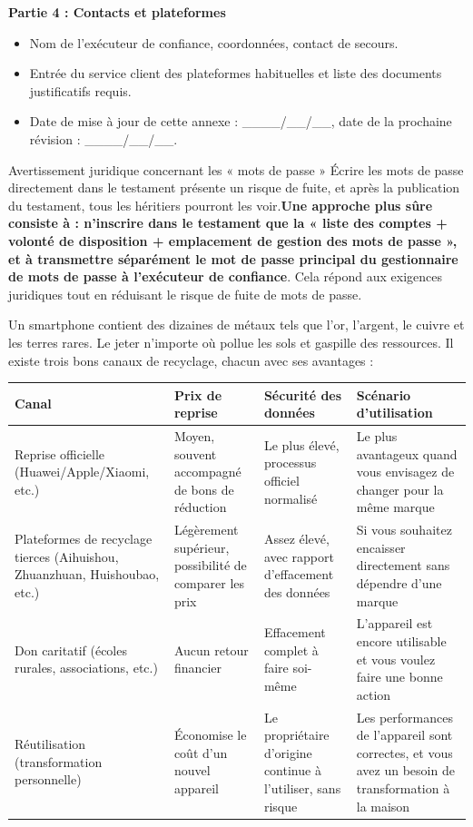 \textbf{Partie 4 : Contacts et plateformes}

\begin{itemize}
  \item Nom de l'exécuteur de confiance, coordonnées, contact de secours.
  \item Entrée du service client des plateformes habituelles et liste des documents justificatifs requis.
  \item Date de mise à jour de cette annexe : \_\_\_\_/\_\_/\_\_, date de la prochaine révision : \_\_\_\_/\_\_/\_\_.
\end{itemize}

\begin{tcbwarn}{Avertissement juridique concernant les « mots de passe »}
Écrire les mots de passe directement dans le testament présente un risque de fuite, et après la publication du testament, tous les héritiers pourront les voir.\textbf{Une approche plus sûre consiste à : n'inscrire dans le testament que la « liste des comptes + volonté de disposition + emplacement de gestion des mots de passe », et à transmettre séparément le mot de passe principal du gestionnaire de mots de passe à l'exécuteur de confiance}. Cela répond aux exigences juridiques tout en réduisant le risque de fuite de mots de passe.

\end{tcbwarn}


Un smartphone contient des dizaines de métaux tels que l'or, l'argent, le cuivre et les terres rares. Le jeter n'importe où pollue les sols et gaspille des ressources. Il existe trois bons canaux de recyclage, chacun avec ses avantages :

\begin{center}
\begin{tabularx}{\linewidth}{|X|X|X|X|}
\hline
\textbf{Canal} & \textbf{Prix de reprise} & \textbf{Sécurité des données} & \textbf{Scénario d'utilisation} \tabularnewline
\hline
Reprise officielle (Huawei/Apple/Xiaomi, etc.) & Moyen, souvent accompagné de bons de réduction & Le plus élevé, processus officiel normalisé & Le plus avantageux quand vous envisagez de changer pour la même marque \tabularnewline
Plateformes de recyclage tierces (Aihuishou, Zhuanzhuan, Huishoubao, etc.) & Légèrement supérieur, possibilité de comparer les prix & Assez élevé, avec rapport d'effacement des données & Si vous souhaitez encaisser directement sans dépendre d'une marque \tabularnewline
Don caritatif (écoles rurales, associations, etc.) & Aucun retour financier & Effacement complet à faire soi-même & L'appareil est encore utilisable et vous voulez faire une bonne action \tabularnewline
Réutilisation (transformation personnelle) & Économise le coût d'un nouvel appareil & Le propriétaire d'origine continue à l'utiliser, sans risque & Les performances de l'appareil sont correctes, et vous avez un besoin de transformation à la maison \tabularnewline
\hline
\end{tabularx}
\end{center}

